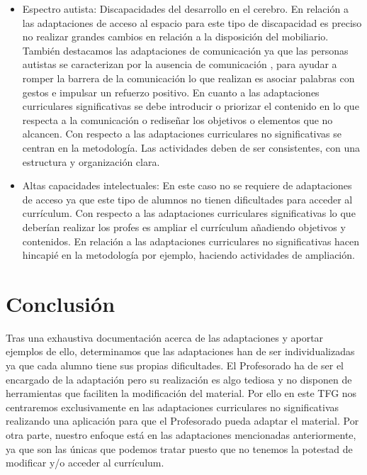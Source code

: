 \begin{itemize}
    \item Espectro autista: Discapacidades del desarrollo en el cerebro. En relación a las adaptaciones de acceso al espacio para este tipo de discapacidad es preciso no realizar grandes cambios en relación a la disposición del mobiliario. También destacamos las adaptaciones de comunicación ya que las personas autistas se caracterizan por la ausencia de comunicación , para ayudar a romper la barrera de la comunicación lo que realizan es asociar palabras con gestos e impulsar un refuerzo positivo.
    En cuanto a las adaptaciones curriculares significativas se debe introducir o priorizar el contenido en lo que respecta a la  comunicación o rediseñar los objetivos o elementos que no alcancen.
    Con respecto a las adaptaciones curriculares no significativas se centran en la metodología. Las actividades deben de ser consistentes, con una estructura y organización clara.

    \item Altas capacidades intelectuales: En este caso no se requiere de adaptaciones de acceso ya que  este tipo de alumnos no tienen dificultades para acceder al currículum. 
    Con respecto a las adaptaciones curriculares significativas lo que deberían realizar los profes es ampliar el currículum añadiendo objetivos y contenidos.
    En relación a las adaptaciones curriculares no significativas hacen hincapié en la metodología por ejemplo, haciendo actividades de ampliación.

\end{itemize}

\section{Conclusión}
Tras una exhaustiva documentación acerca de las adaptaciones y aportar ejemplos de ello, determinamos que las adaptaciones han de ser individualizadas ya que cada alumno tiene sus propias dificultades. El Profesorado ha de ser el encargado de la adaptación pero su realización es algo tediosa y no disponen de herramientas que faciliten la modificación del material. Por ello en este TFG nos centraremos exclusivamente en las adaptaciones curriculares no significativas realizando una aplicación para que el Profesorado pueda adaptar el material. Por otra parte, nuestro enfoque está en las adaptaciones mencionadas anteriormente, ya que son las únicas que  podemos tratar puesto que  no tenemos la potestad de modificar y/o acceder al currículum. 